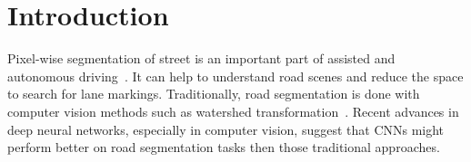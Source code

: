 
\section{Introduction}
Pixel-wise segmentation of street is an important part of assisted and
autonomous driving~\cite{Tarel2009}. It can help to understand road scenes and
reduce the space to search for lane markings. Traditionally, road segmentation
is done with computer vision methods such as watershed
transformation~\cite{Beucher1990}. Recent advances in deep neural networks,
especially in computer vision, suggest that \glspl{CNN} might perform better
on road segmentation tasks then those traditional approaches.